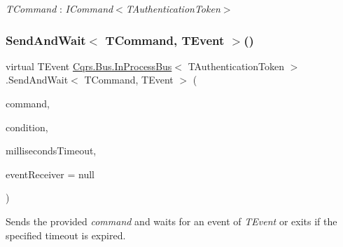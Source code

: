 \begin{Desc}
\item[Type Constraints]\begin{description}
\item[{\em T\+Command} : {\em I\+Command$<$T\+Authentication\+Token$>$}]\end{description}
\end{Desc}
\mbox{\label{classCqrs_1_1Bus_1_1InProcessBus_af3ed033471e85b2943a470c1a635f9c4_af3ed033471e85b2943a470c1a635f9c4}} 
\subsubsection{\texorpdfstring{Send\+And\+Wait$<$ T\+Command, T\+Event $>$()}{SendAndWait< TCommand, TEvent >()}\hspace{0.1cm}{\footnotesize\ttfamily [5/6]}}
{\footnotesize\ttfamily virtual T\+Event \hyperlink{classCqrs_1_1Bus_1_1InProcessBus}{Cqrs.\+Bus.\+In\+Process\+Bus}$<$ T\+Authentication\+Token $>$.Send\+And\+Wait$<$ T\+Command, T\+Event $>$ (\begin{DoxyParamCaption}\item[{T\+Command}]{command,  }\item[{Func$<$ I\+Enumerable$<$ \hyperlink{interfaceCqrs_1_1Events_1_1IEvent}{I\+Event}$<$ T\+Authentication\+Token $>$$>$, T\+Event $>$}]{condition,  }\item[{int}]{milliseconds\+Timeout,  }\item[{\hyperlink{interfaceCqrs_1_1Events_1_1IEventReceiver}{I\+Event\+Receiver}$<$ T\+Authentication\+Token $>$}]{event\+Receiver = {\ttfamily null} }\end{DoxyParamCaption})\hspace{0.3cm}{\ttfamily [virtual]}}



Sends the provided {\itshape command}  and waits for an event of {\itshape T\+Event}  or exits if the specified timeout is expired. 


